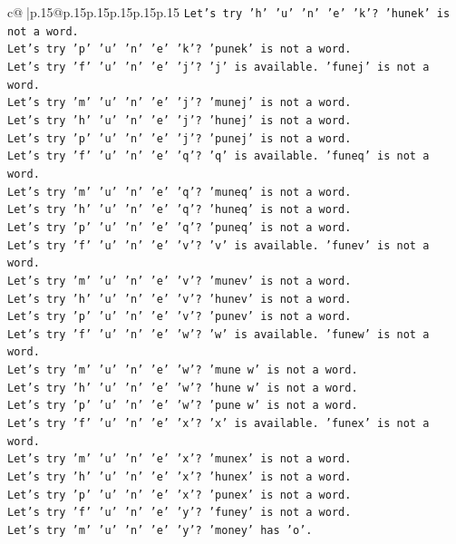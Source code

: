 \documentclass{article}
\begin{document}
{\begin{supertabular}{c@{$\;$}|p{.15\linewidth}@{}p{.15\linewidth}p{.15\linewidth}p{.15\linewidth}p{.15\linewidth}p{.15\linewidth}}
{{{\texttt{Let's try 'h' 'u' 'n' 'e' 'k'? 'hunek' is not a word.} \\
\texttt{Let's try 'p' 'u' 'n' 'e' 'k'? 'punek' is not a word.} \\
\texttt{Let's try 'f' 'u' 'n' 'e' 'j'? 'j' is available. 'funej' is not a word.} \\
\texttt{Let's try 'm' 'u' 'n' 'e' 'j'? 'munej' is not a word.} \\
\texttt{Let's try 'h' 'u' 'n' 'e' 'j'? 'hunej' is not a word.} \\
\texttt{Let's try 'p' 'u' 'n' 'e' 'j'? 'punej' is not a word.} \\
\texttt{Let's try 'f' 'u' 'n' 'e' 'q'? 'q' is available. 'funeq' is not a word.} \\
\texttt{Let's try 'm' 'u' 'n' 'e' 'q'? 'muneq' is not a word.} \\
\texttt{Let's try 'h' 'u' 'n' 'e' 'q'? 'huneq' is not a word.} \\
\texttt{Let's try 'p' 'u' 'n' 'e' 'q'? 'puneq' is not a word.} \\
\texttt{Let's try 'f' 'u' 'n' 'e' 'v'? 'v' is available. 'funev' is not a word.} \\
\texttt{Let's try 'm' 'u' 'n' 'e' 'v'? 'munev' is not a word.} \\
\texttt{Let's try 'h' 'u' 'n' 'e' 'v'? 'hunev' is not a word.} \\
\texttt{Let's try 'p' 'u' 'n' 'e' 'v'? 'punev' is not a word.} \\
\texttt{Let's try 'f' 'u' 'n' 'e' 'w'? 'w' is available. 'funew' is not a word.} \\
\texttt{Let's try 'm' 'u' 'n' 'e' 'w'? 'mune w' is not a word.} \\
\texttt{Let's try 'h' 'u' 'n' 'e' 'w'? 'hune w' is not a word.} \\
\texttt{Let's try 'p' 'u' 'n' 'e' 'w'? 'pune w' is not a word.} \\
\texttt{Let's try 'f' 'u' 'n' 'e' 'x'? 'x' is available. 'funex' is not a word.} \\
\texttt{Let's try 'm' 'u' 'n' 'e' 'x'? 'munex' is not a word.} \\
\texttt{Let's try 'h' 'u' 'n' 'e' 'x'? 'hunex' is not a word.} \\
\texttt{Let's try 'p' 'u' 'n' 'e' 'x'? 'punex' is not a word.} \\
\texttt{Let's try 'f' 'u' 'n' 'e' 'y'? 'funey' is not a word.} \\
\texttt{Let's try 'm' 'u' 'n' 'e' 'y'? 'money' has 'o'.} \\
}}}
\end{supertabular}}
\end{document}
